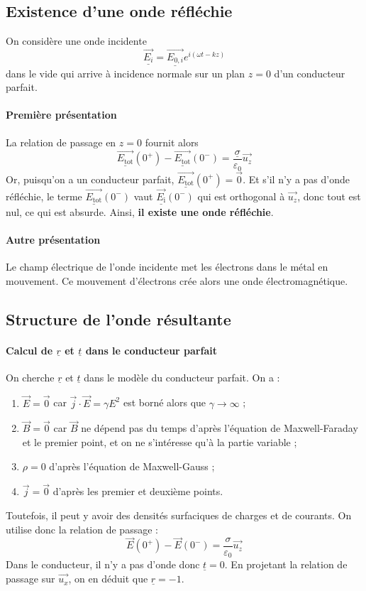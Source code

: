 \documentclass[french]{book}
\theoremstyle{plain}
\theoremstyle{definition}
\theoremstyle{remark}
\begin{document}
\subsection{Existence d'une onde réfléchie} On considère une onde incidente $$\underline{\overrightarrow{E_i}}=\underline{\overrightarrow{E_{0,i}}}e^{i(\omega t-kz)}$$ dans le vide qui arrive à incidence normale sur un plan $z=0$ d'un conducteur parfait. 
\paragraph{Première présentation}La relation de passage en $z=0$ fournit alors $$\underline{\overrightarrow{E_\text{tot}}}(0^+)-\underline{\overrightarrow{E_\text{tot}}}(0^-)=\frac{\underline{\sigma}}{\varepsilon_0}\overrightarrow{u_z}$$ Or, puisqu'on a un conducteur parfait, $\underline{\overrightarrow{E_\text{tot}}}(0^+)=\overrightarrow{0}$. Et s'il n'y a pas d'onde réfléchie, le terme $\underline{\overrightarrow{E_\text{tot}}}(0^-)$ vaut $\underline{\overrightarrow{E_\text{i}}}(0^-)$ qui est orthogonal à $\overrightarrow{u_z}$, donc tout est nul, ce qui est absurde. Ainsi, \textbf{il existe une onde réfléchie}.
\paragraph{Autre présentation} Le champ électrique de l'onde incidente met les électrons dans le métal en mouvement. Ce mouvement d'électrons crée alors une onde électromagnétique.
\subsection{Structure de l'onde résultante}
\paragraph{Calcul de $\underline{r}$ et $\underline{t}$ dans le conducteur parfait} On cherche $\underline{r}$ et $\underline{t}$ dans le modèle du conducteur parfait. On a : 
\begin{enumerate}
	\item $\overrightarrow{E}=\overrightarrow{0}$ car $\overrightarrow{j}\cdot\overrightarrow{E}=\gamma E^2$ est borné alors que $\gamma\to\infty$ ;
	\item $\overrightarrow{B}=\overrightarrow{0}$ car $\overrightarrow{B}$ ne dépend pas du temps d'après l'équation de Maxwell-Faraday et le premier point, et on ne s'intéresse qu'à la partie variable ;
	\item $\rho=0$ d'après l'équation de Maxwell-Gauss ;
	\item $\overrightarrow{j}=\overrightarrow{0}$ d'après les premier et deuxième points.
\end{enumerate} 
Toutefois, il peut y avoir des densités surfaciques de charges et de courants. On utilise donc la relation de passage : $$\overrightarrow{E}(0^+)-\overrightarrow{E}(0^-)=\frac{\sigma}{\varepsilon_0}\overrightarrow{u_z}$$ Dans le conducteur, il n'y a pas d'onde donc $\underline{t}=0$. En projetant la relation de passage sur $\overrightarrow{u_x}$, on en déduit que $\underline{r}=-1$.
\end{document}
